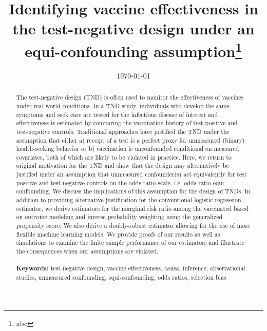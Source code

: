 \documentclass[11pt]{article}
\begin{document}
\begin{titlepage}
\title{Identifying vaccine effectiveness in the test-negative design under an equi-confounding assumption\thanks{abc}}
\author[1]{ }
\date{\today}
\maketitle

\begin{abstract}
    The test-negative design (TND) is often used to monitor the effectiveness of vaccines under real-world conditions. In a TND study, individuals who develop the same symptoms and seek care are tested for the infectious disease of interest and effectiveness is estimated by comparing the vaccination history of test-positive and test-negative controls. Traditional approaches have justified the TND under the assumption that either a) receipt of a test is a perfect proxy for unmeasured (binary) health-seeking behavior or b) vaccination is unconfounded conditional on measured covariates, both of which are likely to be violated in practice. Here, we return to original motivation for the TND and show that the design may alternatively be justified under an assumption that unmeasured confounder(s) act equivalently for test positive and test negative controls on the odds ratio scale, i.e. odds ratio equi-confounding. We discuss the implications of this assumption for the design of TNDs. In addition to providing alternative justification for the conventional logistic regression estimator, we derive estimators for the marginal risk ratio among the vaccinated based on outcome modeling and inverse probability weighting using the generalized propensity score. We also derive a doubly-robust estimator allowing for the use of more flexible machine learning models. We provide proofs of our results as well as simulations to examine the finite sample performance of our estimators and illustrate the consequences when our assumptions are violated.
\noindent \\
\vspace{0in} \\
\noindent\textbf{Keywords:} test-negative design, vaccine effectiveness, causal inference, observational studies, unmeasured confounding, equi-confounding, odds ratios, selection bias
\bigskip
\end{abstract}
\setcounter{page}{0}
\thispagestyle{empty}
\end{titlepage}
\pagebreak \newpage
\end{document}
